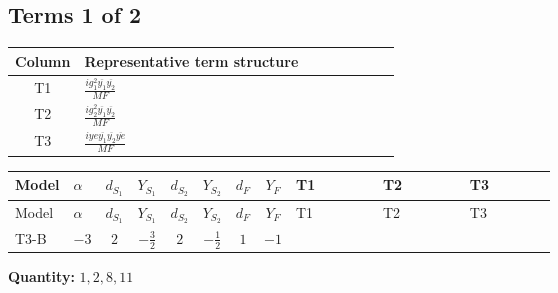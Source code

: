 \documentclass[8pt]{article}
\begin{document}
\begin{landscape}
\subsection*{Terms 1 of 2}
\begin{center}
\begin{tabular}{@{}c >{\raggedright\arraybackslash}p{0.82\linewidth}@{}}
\toprule
Column & Representative term structure \\
\midrule
T1 & \(\displaystyle \frac{i g_{1}^{2} \overline{y_{1}} \overline{y_{2}}}{MF}\) \\
\midrule
T2 & \(\displaystyle \frac{i g_{2}^{2} \overline{y_{1}} \overline{y_{2}}}{MF}\) \\
\midrule
T3 & \(\displaystyle \frac{i ye \overline{y_{1}} \overline{y_{2}} \overline{ye}}{MF}\) \\
\midrule
\bottomrule
\end{tabular}
\end{center}
\smallskip
\tiny
\begin{longtable}{@{}llcccccc >{\raggedright\arraybackslash}p{0.21\linewidth} >{\raggedright\arraybackslash}p{0.21\linewidth} >{\raggedright\arraybackslash}p{0.21\linewidth}@{}}
\toprule
Model & $\alpha$ & $d_{S_1}$ & $Y_{S_1}$ & $d_{S_2}$ & $Y_{S_2}$ & $d_F$ & $Y_F$ & T1 & T2 & T3 \\
\midrule
\endfirsthead
\toprule
Model & $\alpha$ & $d_{S_1}$ & $Y_{S_1}$ & $d_{S_2}$ & $Y_{S_2}$ & $d_F$ & $Y_F$ & T1 & T2 & T3 \\
\midrule
\endhead
T3-B & $-3$ & $2$ & $-\frac{3}{2}$ & $2$ & $-\frac{1}{2}$ & $1$ & $-1$ & \scriptsize\adjustbox{max width=\linewidth}{$\begin{gathered} \frac{3 i g_{1}^{2} \overline{y_{1}} \overline{y_{2}}}{4 MF}\end{gathered}$} & \scriptsize\adjustbox{max width=\linewidth}{$\begin{gathered} \frac{3 i g_{2}^{2} \overline{y_{1}} \overline{y_{2}}}{8 MF}\end{gathered}$} & \scriptsize\adjustbox{max width=\linewidth}{$\begin{gathered} - \frac{i ye \overline{y_{1}} \overline{y_{2}} \overline{ye}}{8 MF}\end{gathered}$} \\
\midrule
\bottomrule
\end{longtable}
\clearpage
\noindent\textbf{Quantity: }$\mathrm{1,2,8,11}$\par\smallskip

\end{landscape}
\end{document}
